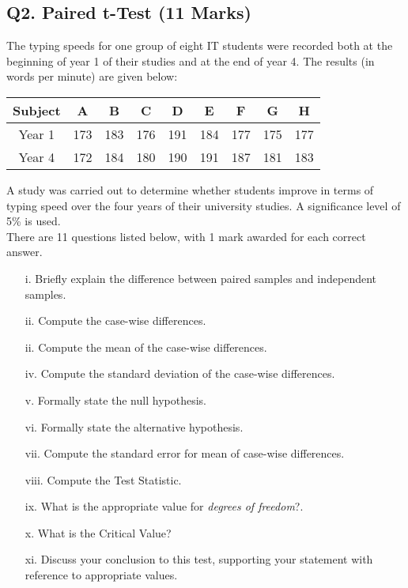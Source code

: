 \documentclass[a4paper,12pt]{article}
\begin{document}
\subsection*{Q2. Paired t-Test (11 Marks)}

The typing speeds for one group of eight IT students were recorded both at the beginning of year 1 of their studies and at the end of year 4. The results (in words per minute) are given below:

\begin{center}
\begin{tabular}{|c|c|c|c|c|c|c|c|c|}
\hline
Subject& A& B& C& D& E &F &G &H \\ \hline
Year 1 &173& 183& 176& 191& 184 &177& 175& 177\\ \hline
Year 4 &172 &184 &180 &190& 191& 187& 181& 183\\ \hline
\end{tabular}
\end{center}


A study was carried out to determine whether students improve in terms of typing speed over the four years of their university studies. A significance level of 5\% is used.\\
\bigskip
There are 11 questions listed below, with 1 mark awarded for each correct answer.
\begin{itemize}
\item[i.] Briefly explain the difference between paired samples and independent samples.
\item[ii.] Compute the case-wise differences.
\item[ii.] Compute the mean of the case-wise differences.
\item[iv.] Compute the standard deviation of the case-wise differences.
\item[v.] Formally state the null hypothesis.
\item[vi.] Formally state the alternative hypothesis.
\item[vii.] Compute the standard error for mean of case-wise differences.
\item[viii.] Compute the Test Statistic.
\item[ix.] What is the appropriate value for \textit{degrees of freedom}?.
\item[x.] What is the Critical Value?
\item[xi.] Discuss your conclusion to this test, supporting your statement with reference to appropriate values.
\end{itemize}
\end{document}
